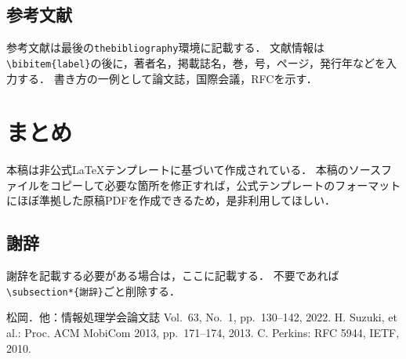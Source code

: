 \documentclass[a4j,9pt,twocolumn,uplatex]{jsarticle}
\begin{document}
\subsection{参考文献}
参考文献は最後の\verb|thebibliography|環境に記載する．
文献情報は\verb|\bibitem{label}|の後に，著者名，掲載誌名，巻，号，ページ，発行年などを入力する．
書き方の一例として論文誌\cite{Matsuoka2022}，国際会議\cite{Suzuki2013}，RFC\cite{MIPv4}を示す．


\section{まとめ}

本稿は非公式\LaTeX テンプレートに基づいて作成されている．
本稿のソースファイルをコピーして必要な箇所を修正すれば，公式テンプレートのフォーマットにほぼ準拠した原稿PDFを作成できるため，是非利用してほしい．


\subsection*{謝辞}
謝辞を記載する必要がある場合は，ここに記載する．
不要であれば\verb|\subsection*{謝辞}|ごと削除する．


\begin{thebibliography}{9}      %
     松岡．他：情報処理学会論文誌 Vol.~63, No.~1, pp.~130--142, 2022.
     H. Suzuki, et al.: Proc. ACM MobiCom 2013, pp.~171--174, 2013.
     C. Perkins: RFC 5944, IETF, 2010.
\end{thebibliography}
\end{document}
